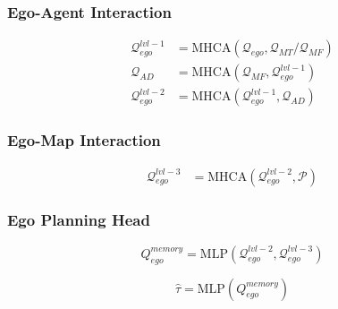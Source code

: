 \subsubsection{Ego-Agent Interaction}
\begin{align}
  \mathcal{Q}^{lvl-1}_{ego} &= \text{MHCA}(\mathcal{Q}_{ego}, \mathcal{Q}_{MT} / \mathcal{Q}_{MF}) \\
  \mathcal{Q}_{AD} &= \text{MHCA}(\mathcal{Q}_{MF}, \mathcal{Q}_{ego}^{lvl-1}) \label{eq:agent_decision}\\
  \mathcal{Q}^{lvl-2}_{ego} &= \text{MHCA}(\mathcal{Q}_{ego}^{lvl-1}, \mathcal{Q}_{{AD}})
\end{align}

\subsubsection{Ego-Map Interaction}
\begin{align}
  \mathcal{Q}^{lvl-3}_{ego} &= \text{MHCA}(\mathcal{Q}^{lvl-2}_{ego}, \mathcal{P})
\end{align}

\subsubsection{Ego Planning Head}
\label{sec:planning_head}
\begin{equation}
    Q_{ego}^{memory} = \textrm{MLP}(\mathcal{Q}_{ego}^{lvl-2}, \mathcal{Q}_{ego}^{lvl-3})
\end{equation}

\begin{equation}
    \hat{\tau} = \textrm{MLP}(Q_{ego}^{memory})
\end{equation}

